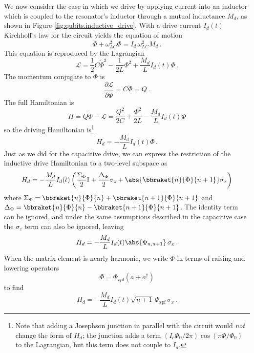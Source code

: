 We now consider the case in which we drive by applying current into an inductor which is coupled to the resonator's inductor through a mutual inductance $M_d$, as shown in Figure \ref{fig:qubits.inductive_drive}.
With a drive current $I_d(t)$ Kirchhoff's law for the circuit yields the equation of motion
\begin{equation}
  \ddot{\Phi} + \omega_{LC}^2 \Phi = I_d \, \omega_{LC}^2 M_d \, .
\end{equation}
This equation is reproduced by the Lagrangian
\begin{equation}
  \mathcal{L} = \frac{1}{2}C \dot{\Phi}^2 - \frac{1}{2L} \Phi^2 + \frac{M_d}{L}I_d(t) \Phi \, .
\end{equation}
The momentum conjugate to $\Phi$ is
\begin{equation*}
  \frac{\partial \mathcal{L}}{\partial \dot{\Phi}} = C \dot{\Phi} = Q \, .
\end{equation*}
The full Hamiltonian is
\begin{equation*}
  H
  = Q \dot{\Phi} - \mathcal{L}
  = \frac{Q^2}{2C} + \frac{\Phi^2}{2L} - \frac{M_d}{L} I_d(t) \Phi
\end{equation*}
so the driving Hamiltonian is\footnote{Note that adding a Josephson junction in parallel with the circuit would \emph{not} change the form of $H_d$; the junction adds a term $(I_c \Phi_0 / 2\pi)\cos(\pi \Phi / \Phi_0)$ to the Lagrangian, but this term does not couple to $I_d$.}
\begin{equation*}
  H_d = - \frac{M_d}{L}I_d(t) \Phi \, .
\end{equation*}
Just as we did for the capacitive drive, we can express the restriction of the inductive drive Hamiltonian to a two-level subspace as
\begin{equation*}
  H_d = -\frac{M_d}{L} I_d(t) \left(
      \frac{\Sigma_\Phi}{2} \mathbb{I}
    + \frac{\Delta_\Phi}{2} \sigma_z
    + \abs{\bbraket{n}{\Phi}{n+1}} \sigma_x
  \right)
\end{equation*}
where $\Sigma_\Phi = \bbraket{n}{\Phi}{n} + \bbraket{n+1}{\Phi}{n+1}$ and $\Delta_\Phi = \bbraket{n}{\Phi}{n} - \bbraket{n+1}{\Phi}{n+1}$.
The identity term can be ignored, and under the same assumptions described in the capacitive case the $\sigma_z$ term can also be ignored, leaving
\begin{equation}
  H_d = - \frac{M_d}{L} I_d(t) \abs{\Phi_{n,n+1}} \, \sigma_x \, .
\end{equation}
When the matrix element is nearly harmonic, we write $\Phi$ in terms of raising and lowering operators
\begin{equation*}
  \Phi = \Phi_\text{zpf} (a + a^\dagger)
\end{equation*}
to find
\begin{equation*}
  H_d = - \frac{M_d}{L} I_d(t) \sqrt{n+1} \, \Phi_\text{zpf} \, \sigma_x
  \, .
\end{equation*}

